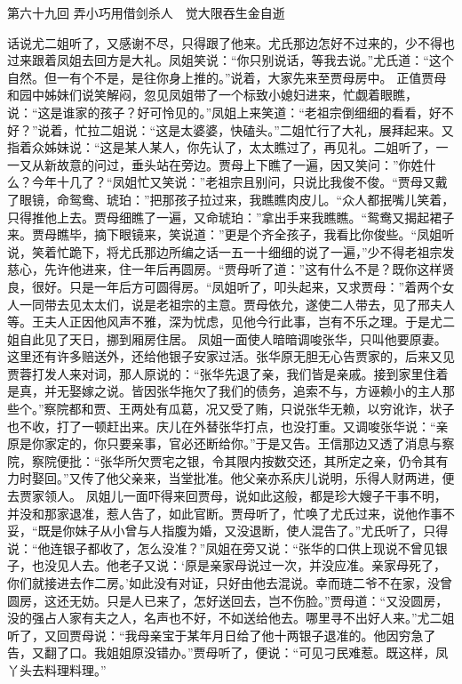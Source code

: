 \documentclass[12pt,oneside]{book}
\begin{document}
第六十九回  弄小巧用借剑杀人　觉大限吞生金自逝


话说尤二姐听了，又感谢不尽，只得跟了他来。尤氏那边怎好不过来的，少不得也过来跟着凤姐去回方是大礼。凤姐笑说：“你只别说话，等我去说。”尤氏道：“这个自然。但一有个不是，是往你身上推的。”说着，大家先来至贾母房中。
正值贾母和园中姊妹们说笑解闷，忽见凤姐带了一个标致小媳妇进来，忙觑着眼瞧，说：“这是谁家的孩子？好可怜见的。”凤姐上来笑道：“老祖宗倒细细的看看，好不好？”说着，忙拉二姐说：“这是太婆婆，快磕头。”二姐忙行了大礼，展拜起来。又指着众姊妹说：“这是某人某人，你先认了，太太瞧过了，再见礼。二姐听了，一一又从新故意的问过，垂头站在旁边。贾母上下瞧了一遍，因又笑问：”你姓什么？今年十几了？“凤姐忙又笑说：”老祖宗且别问，只说比我俊不俊。“贾母又戴了眼镜，命鸳鸯、琥珀：”把那孩子拉过来，我瞧瞧肉皮儿。“众人都抿嘴儿笑着，只得推他上去。贾母细瞧了一遍，又命琥珀：”拿出手来我瞧瞧。“鸳鸯又揭起裙子来。贾母瞧毕，摘下眼镜来，笑说道：”更是个齐全孩子，我看比你俊些。“凤姐听说，笑着忙跪下，将尤氏那边所编之话一五一十细细的说了一遍，”少不得老祖宗发慈心，先许他进来，住一年后再圆房。“贾母听了道：”这有什么不是？既你这样贤良，很好。只是一年后方可圆得房。“凤姐听了，叩头起来，又求贾母：”着两个女人一同带去见太太们，说是老祖宗的主意。贾母依允，遂使二人带去，见了邢夫人等。王夫人正因他风声不雅，深为忧虑，见他今行此事，岂有不乐之理。于是尤二姐自此见了天日，挪到厢房住居。
凤姐一面使人暗暗调唆张华，只叫他要原妻。这里还有许多赔送外，还给他银子安家过活。张华原无胆无心告贾家的，后来又见贾蓉打发人来对词，那人原说的：“张华先退了亲，我们皆是亲戚。接到家里住着是真，并无娶嫁之说。皆因张华拖欠了我们的债务，追索不与，方诬赖小的主人那些个。”察院都和贾、王两处有瓜葛，况又受了贿，只说张华无赖，以穷讹诈，状子也不收，打了一顿赶出来。庆儿在外替张华打点，也没打重。又调唆张华说：“亲原是你家定的，你只要亲事，官必还断给你。”于是又告。王信那边又透了消息与察院，察院便批：“张华所欠贾宅之银，令其限内按数交还，其所定之亲，仍令其有力时娶回。”又传了他父亲来，当堂批准。他父亲亦系庆儿说明，乐得人财两进，便去贾家领人。
凤姐儿一面吓得来回贾母，说如此这般，都是珍大嫂子干事不明，并没和那家退准，惹人告了，如此官断。贾母听了，忙唤了尤氏过来，说他作事不妥，“既是你妹子从小曾与人指腹为婚，又没退断，使人混告了。”尤氏听了，只得说：“他连银子都收了，怎么没准？”凤姐在旁又说：“张华的口供上现说不曾见银子，也没见人去。他老子又说：‘原是亲家母说过一次，并没应准。亲家母死了，你们就接进去作二房。’如此没有对证，只好由他去混说。幸而琏二爷不在家，没曾圆房，这还无妨。只是人已来了，怎好送回去，岂不伤脸。”贾母道：“又没圆房，没的强占人家有夫之人，名声也不好，不如送给他去。哪里寻不出好人来。”尤二姐听了，又回贾母说：“我母亲宝于某年月日给了他十两银子退准的。他因穷急了告，又翻了口。我姐姐原没错办。”贾母听了，便说：“可见刁民难惹。既这样，凤丫头去料理料理。”
\end{document}
